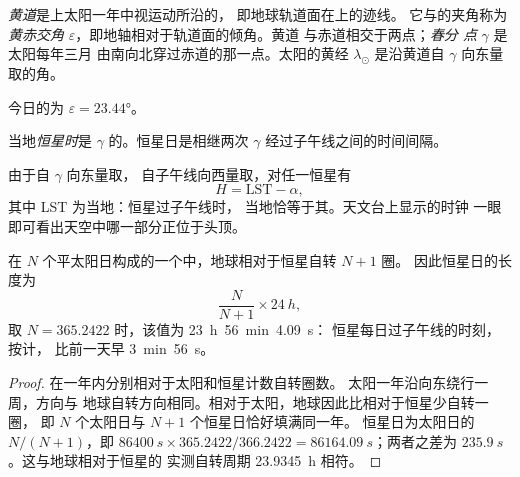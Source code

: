 \begin{definition}[黄道]\label{def:b1:spherical-astronomy:ecliptic}
\emph{黄道}是上太阳一年中视运动所沿的，
即地球轨道面在上的迹线。
它与的夹角称为
\emph{黄赤交角}
$\varepsilon$，即地轴相对于轨道面的倾角。黄道
与赤道相交于两点；\emph{春分
点} $\gamma$ 是太阳每年三月
由南向北穿过赤道的那一点。太阳的黄经 $\lambda_\odot$
是沿黄道自 $\gamma$ 向东量取的角。
\end{definition}

今日的为 $\varepsilon = \ang{23.44}$。

\begin{definition}[恒星时]\label{def:b1:spherical-astronomy:sidereal-time}
当地\emph{恒星时}是
 $\gamma$ 的。恒星日是相继两次
$\gamma$ 经过子午线之间的时间间隔。
\end{definition}

由于自 $\gamma$ 向东量取，
自子午线向西量取，对任一恒星有
\[
  H = \mathrm{LST} - \alpha ,
\]
其中 LST 为当地：恒星过子午线时，
当地恰等于其。天文台上显示的时钟
一眼即可看出天空中哪一部分正位于头顶。

\begin{proposition}[恒星日与太阳日]\label{prop:b1:spherical-astronomy:sidereal-day}
在 $N$ 个平太阳日构成的一个中，地球相对于恒星自转 $N + 1$ 圈。
因此恒星日的长度为
\[
  \frac{N}{N + 1}\times\qty{24}{h},
\]
取 $N = 365.2422$ 时，该值为 \qty{23}{h}~\qty{56}{min}~\qty{4.09}{s}：
恒星每日过子午线的时刻，按计，
比前一天早 \qty{3}{min}~\qty{56}{s}。
\end{proposition}

\begin{proof}
在一年内分别相对于太阳和恒星计数自转圈数。
太阳一年沿向东绕行一周，方向与
地球自转方向相同。相对于太阳，地球因此比相对于恒星少自转一圈，
即 $N$ 个太阳日与 $N + 1$ 个恒星日恰好填满同一年。
恒星日为太阳日的 $N/(N+1)$，即
$\qty{86400}{s}\times 365.2422/366.2422 = \qty{86164.09}{s}$；两者之差为
$\qty{235.9}{s}$。这与地球相对于恒星的
实测自转周期 \qty{23.9345}{h} 相符。
\end{proof}

